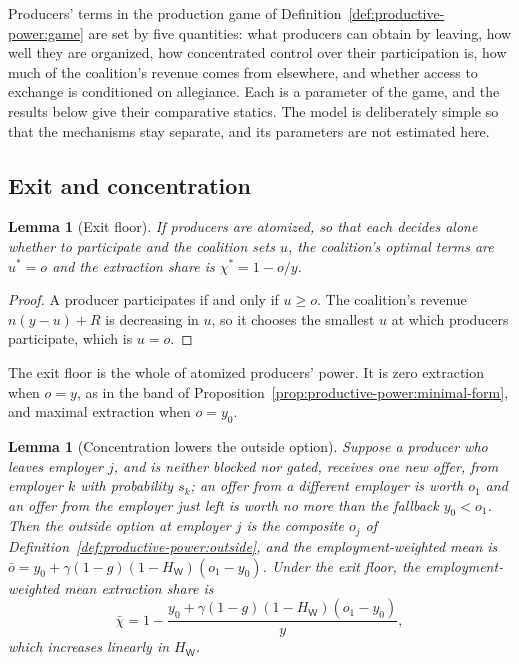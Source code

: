 \documentclass[11pt,letterpaper]{article}
\newtheorem{lemma}[theorem]{Lemma}
\theoremstyle{definition}
\theoremstyle{remark}
\newcommand{\pW}{\mathsf{W}}
\newcommand{\HW}{H_{\pW}}
\begin{document}
Producers' terms in the production game of Definition~\ref{def:productive-power:game} are set by five quantities: what producers can obtain by leaving, how well they are organized, how concentrated control over their participation is, how much of the coalition's revenue comes from elsewhere, and whether access to exchange is conditioned on allegiance. Each is a parameter of the game, and the results below give their comparative statics. The model is deliberately simple so that the mechanisms stay separate, and its parameters are not estimated here.

\subsection{Exit and concentration}

\begin{lemma}[Exit floor]
\label{lem:productive-power:exit-floor}
If producers are atomized, so that each decides alone whether to participate and the coalition sets $u$, the coalition's optimal terms are $u^*=o$ and the extraction share is $\chi^*=1-o/y$.
\end{lemma}

\begin{proof}
A producer participates if and only if $u\ge o$. The coalition's revenue $n(y-u)+R$ is decreasing in $u$, so it chooses the smallest $u$ at which producers participate, which is $u=o$.
\end{proof}

The exit floor is the whole of atomized producers' power. It is zero extraction when $o=y$, as in the band of Proposition~\ref{prop:productive-power:minimal-form}, and maximal extraction when $o=y_0$.

\begin{lemma}[Concentration lowers the outside option]
\label{lem:productive-power:concentration}
Suppose a producer who leaves employer $j$, and is neither blocked nor gated, receives one new offer, from employer $k$ with probability $s_k$; an offer from a different employer is worth $o_1$ and an offer from the employer just left is worth no more than the fallback $y_0<o_1$. Then the outside option at employer $j$ is the composite $o_j$ of Definition~\ref{def:productive-power:outside}, and the employment-weighted mean is $\bar o=y_0+\gamma(1-g)(1-\HW)(o_1-y_0)$. Under the exit floor, the employment-weighted mean extraction share is
\[
\bar\chi=1-\frac{y_0+\gamma(1-g)(1-\HW)(o_1-y_0)}{y},
\]
which increases linearly in $\HW$.
\end{lemma}
\end{document}
